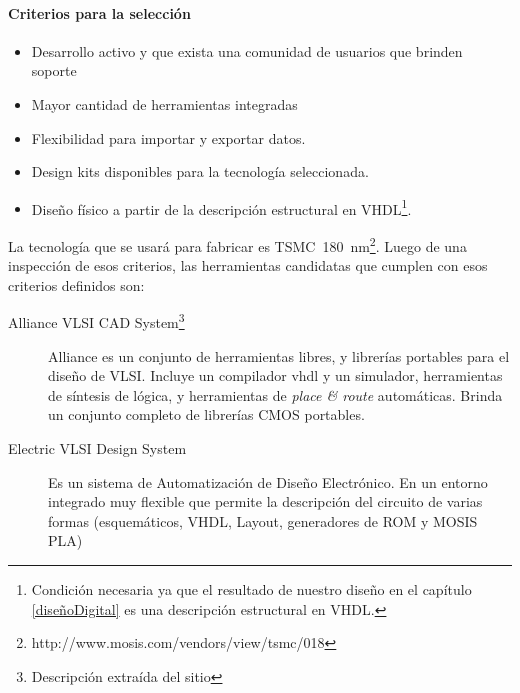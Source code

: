 \paragraph{Criterios para la selección}
\begin{itemize}
\item Desarrollo activo y que exista una comunidad de usuarios que brinden soporte
\item Mayor cantidad de herramientas integradas
\item Flexibilidad para importar y exportar datos. 
\item Design kits disponibles para la tecnología seleccionada.
\item Diseño físico a partir de la descripción estructural en VHDL\footnote{Condición necesaria ya que el resultado de nuestro diseño en el capítulo \ref{diseñoDigital} es una descripción estructural en VHDL.}.
\end{itemize}

La tecnología que se usará para fabricar es TSMC~180~nm\footnote{http://www.mosis.com/vendors/view/tsmc/018}.
Luego de una inspección de esos criterios, las herramientas candidatas que cumplen con esos criterios definidos son:

\begin{description}
\item[Alliance VLSI CAD System\footnote{Descripción extraída del sitio}]Alliance es un conjunto de herramientas libres, y librerías portables para el diseño de VLSI. Incluye un compilador vhdl y un simulador, herramientas de síntesis de lógica, y herramientas de \emph{place \& route} automáticas. Brinda un conjunto completo de librerías CMOS portables.

\item[Electric VLSI Design System] Es un sistema de Automatización de Diseño Electrónico. En un entorno integrado muy flexible que permite la descripción del circuito de varias formas (esquemáticos, VHDL, Layout, generadores de ROM y MOSIS PLA)   

\end{description}




